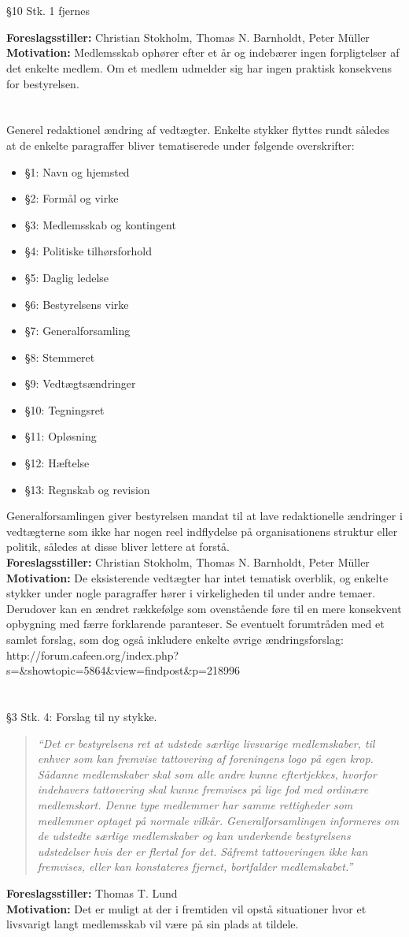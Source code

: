 \documentclass[a4paper,12pt,danish]{article}
\newcommand\cit[1]{
    \begin{quote}
        \textit{``#1''}
    \end{quote}
}
\newcommand\who[1]{
    \textbf{Foreslagsstiller:} #1\\
}
\newcommand\why[1]{
    \textbf{Motivation:} #1\\
}
\newcommand\change[1]{
    \section{}
    #1
}
\begin{document}
\change{
	\S10 Stk. 1 fjernes
    \who{Christian Stokholm, Thomas N. Barnholdt, Peter Müller}
    \why{Medlemsskab ophører efter et år og indebærer ingen forpligtelser af det enkelte medlem. Om et medlem udmelder sig har ingen praktisk konsekvens for bestyrelsen.}
}

\change{
	Generel redaktionel ændring af vedtægter. Enkelte stykker flyttes rundt således at de enkelte paragraffer bliver tematiserede under følgende overskrifter:
    \begin{itemize}
        \item \S1: Navn og hjemsted
        \item \S2: Formål og virke
        \item \S3: Medlemsskab og kontingent
        \item \S4: Politiske tilhørsforhold
        \item \S5: Daglig ledelse
        \item \S6: Bestyrelsens virke
        \item \S7: Generalforsamling
        \item \S8: Stemmeret
        \item \S9: Vedtægtsændringer
        \item \S10: Tegningsret
        \item \S11: Opløsning
        \item \S12: Hæftelse
        \item \S13: Regnskab og revision
    \end{itemize}
    Generalforsamlingen giver bestyrelsen mandat til at lave redaktionelle ændringer i vedtægterne som ikke har nogen reel indflydelse på organisationens struktur eller politik, således at disse bliver lettere at forstå.\\

    \who{Christian Stokholm, Thomas N. Barnholdt, Peter Müller}
    \why{De eksisterende vedtægter har intet tematisk overblik, og enkelte stykker under nogle paragraffer hører i virkeligheden til under andre temaer. Derudover kan en ændret rækkefølge som ovenstående føre til en mere konsekvent opbygning med færre forklarende paranteser. Se eventuelt forumtråden med et samlet forslag, som dog også inkludere enkelte øvrige ændringsforslag:\\
    http://forum.cafeen.org/index.php?s=\&showtopic=5864\&view=findpost\&p=218996}
}

\change{
	\S3 Stk. 4:
Forslag til ny stykke.
    \cit{Det er bestyrelsens ret at udstede særlige livsvarige medlemskaber, til enhver som kan fremvise tattovering af foreningens logo på egen krop. Sådanne medlemskaber skal som alle andre kunne eftertjekkes, hvorfor indehavers tattovering skal kunne fremvises på lige fod med ordinære medlemskort. Denne type medlemmer har samme rettigheder som medlemmer optaget på normale vilkår. Generalforsamlingen informeres om de udstedte særlige medlemskaber og kan underkende bestyrelsens udstedelser hvis der er flertal for det. Såfremt tattoveringen ikke kan fremvises, eller kan konstateres fjernet, bortfalder medlemskabet.}
    \who{Thomas T. Lund}
    \why{Det er muligt at der i fremtiden vil opstå situationer hvor et livsvarigt langt medlemsskab vil være på sin plads at tildele.}
}
\end{document}
